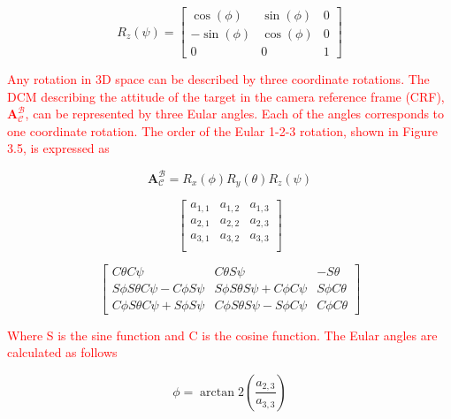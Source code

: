 \begin{equation}
    R_z(\psi) = \begin{bmatrix} 
        \cos(\phi) & \sin(\phi) & 0 \\
        -\sin(\phi) & \cos(\phi) & 0 \\
        0 & 0 & 1
    \end{bmatrix}
    \label{Eq:3.3}
\end{equation}

\textcolor{red}{Any rotation in 3D space can be described by three coordinate rotations. The DCM describing the attitude of the target in the camera reference frame
(CRF), $\mathbf{A}_{\mathcal{C}}^{\mathcal{B}}$, can be represented by three Eular angles. Each of the angles corresponds to one coordinate rotation. The order
of the Eular 1-2-3 rotation, shown in Figure 3.5, is expressed as}

\begin{equation}
    \boldsymbol{A}_{\mathcal{C}}^{\mathcal{B}} = R_x(\phi)R_y(\theta)R_z(\psi)
    \label{Eq:3.4}
\end{equation}

\begin{equation}
    \begin{bmatrix}
        a_{1,1} & a_{1,2} & a_{1,3}\\
        a_{2,1} & a_{2,2} & a_{2,3}\\
        a_{3,1} & a_{3,2} & a_{3,3}\\
    \end{bmatrix}
\end{equation}

\begin{equation}
    \begin{bmatrix}
        C\theta C\psi & C\theta S\psi &  -S\theta\\
        S\phi S\theta C\psi - C\phi S\psi & S\phi S\theta S\psi + C\phi C\psi & S\phi C\theta\\
        C\phi S\theta C\psi + S\phi S\psi &  C\phi S\theta S\psi - S\phi C\psi & C\phi C\theta
    \end{bmatrix}
\end{equation}

\textcolor{red}{Where S is the sine function and C is the cosine function. The Eular angles are calculated as follows}

\begin{equation}
    \phi = \arctan2\left(\frac{a_{2,3}}{a_{3,3}}\right)
\end{equation}

